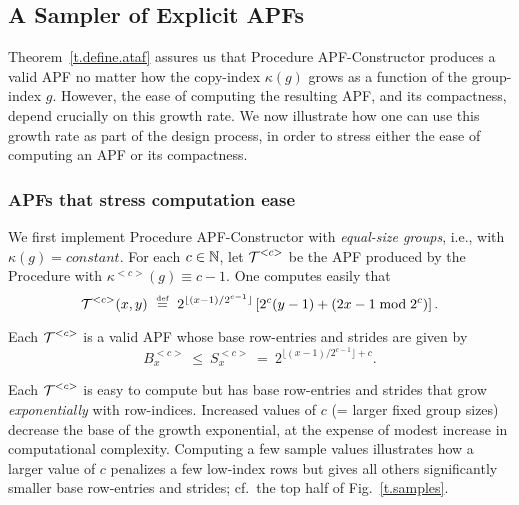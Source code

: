 \subsection{A Sampler of Explicit APFs}
\label{s.efficient}

Theorem~\ref{t.define.ataf} assures us that Procedure {\sf
APF-Constructor} produces a valid APF no matter how the copy-index
$\kappa(g)$ grows as a function of the group-index $g$.  However, the
ease of computing the resulting APF, and its compactness, depend
crucially on this growth rate.  We now illustrate how one can use this
growth rate as part of the design process, in order to stress either
the ease of computing an APF or its compactness.

\subsubsection{APFs that stress computation ease}

We first implement Procedure {\sf APF-Constructor} with {\em
equal-size groups}, i.e., with $\kappa(g) = constant$.  For each $c
\in \mathbb{N}$, let $\mbox{$\cal T$}^{<c>}$ be the APF produced by the Procedure with
$\kappa^{<c>}(g) \equiv c-1$.  One computes easily that
\[ \mbox{$\cal T$}^{<c>}(x, y) \ \stackrel{\mbox{{\tiny def}}}{=} \
   2^{\lfloor (x-1)/2^{c-1} \rfloor} \left[ 2^c (y-1) + (2x-1 \bmod
        2^c) \right].  \]

\begin{prop}
\label{p.k.c}
Each $\mbox{$\cal T$}^{<c>}$ is a valid APF whose base row-entries and strides
are given by
\begin{equation}
\label{e.stride.c}
B^{<c>}_x \ \leq \
S^{<c>}_x \ = \ 2^{\lfloor (x-1)/2^{c-1} \rfloor + c}.
\end{equation}
\end{prop}

Each $\mbox{$\cal T$}^{<c>}$ is easy to compute but has base row-entries and
strides that grow {\em exponentially} with row-indices.  Increased
values of $c$ (= larger fixed group sizes) decrease the base of the
growth exponential, at the expense of modest increase in computational
complexity.  Computing a few sample values illustrates how a larger
value of $c$ penalizes a few low-index rows but gives all others
significantly smaller base row-entries and strides; cf.~the top half
of Fig.~\ref{t.samples}.

